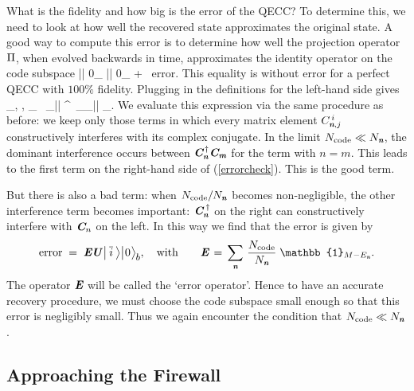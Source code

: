 \documentclass[12pt]{article}%
\def\spc{\hspace{.5pt}}
\def\be{\begin{equation}}
\def\ee{\end{equation}}
\begin{document}
What is the fidelity and how big is the error of the QECC? To determine
this, we need to look at how well the recovered state approximates the original state.
A good way to compute this error is to determine how well the projection operator $\mbox{\textit{\textbf{$\Pi$}\!\,}}$, when evolved backwards in time, approximates the
identity operator on the code subspace
\bea
\label{errorcheck}
\Pi  \spc \uU \bigl|\spc \ibar  \spc \ra  \bigl| \spc 0\spc \ra_{\nspc \bbbb} \is \uU \bigl|\spc \ibar  \spc \ra  \bigl| \spc 0\spc \ra_{\nspc \bbbb} \; + \ \mbox{error}. %
\eea
This equality is without error for a perfect QECC with $100\%$ fidelity. Plugging in the definitions for the left-hand side gives
\bea
\sum_{\kbar, \nom,\mom}
  {\pp_\nom} \, \cC_\nom\spc  \bigl|\spc \kbar\spc \ra \la\spc \kbar\spc \bigl|  \cC^{\, \dag}_\nom \cC_\mom\smpc \bigl|\smpc \ibar \smpc \ra  \bigl| \spc \mom \spc \ra_{\nspc \bbbb}. 
\eea
We evaluate this expression via the same procedure as before: we keep only those terms in which every matrix element $C_{{ \textit{\textbf n}}, j}^{\, i}$ 
constructively interferes with its complex conjugate. In the limit ${N_{\rm code}}\ll N_{ \textit{\textbf n}}$,  the dominant interference
occurs between $\mbox{\textit{\textbf{C}\!\,}}^{\, \dag}_{ \textit{\textbf n}} \mbox{\textit{\textbf{C}\!\,}}_{ \textit{\textbf m}}$ for the term with $n=m$. This leads to the
first term on the right-hand side of (\ref{errorcheck}). This is the good term. 

\def\hH{\textit{\textbf H}} 
But there is also a bad term: when ${N_{\rm code}}/N_{ \textit{\textbf n}} $ becomes non-negligible, the other
interference term becomes important: $\mbox{\textit{\textbf{C}\!\,}}_{ \textit{\textbf n}}^{\; \dag}$ on the right can constructively interfere with $\mbox{\textit{\textbf{C}\!\,}}_n$ on the left. 
In this way we find that the error is given by
\be
\label{errorc}
\mbox{error}\; =\;  \Error \uU \bigl|\spc \ibar  \spc \ra  \bigl| \spc 0\spc \ra_{\nspc \bbbb},\quad\mbox{with}\qquad \Error\,=\,\sum_\nom\, \frac{{N_{\rm code}}}{N_\nom}\; \mathbb{1}_{M-E_\nom}.
\ee
The operator $\mbox{\textit{\textbf{E}\!\,}}$ will be called the `error operator'. 
Hence to have an accurate recovery procedure, we must choose the code subspace small enough so that this error is negligibly small.
Thus we again encounter the condition that ${N_{\rm code}} \ll N_{ \textit{\textbf n}}$.

\subsection{Approaching the Firewall}
\end{document}
